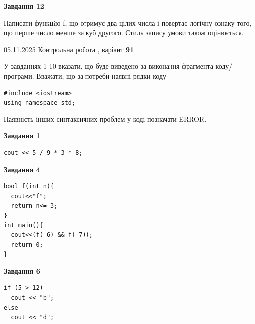 \documentclass[12pt, ukrainian]{article}
\begin{document}
{\begin {large}
\begin{minipage}[t]{11.0cm}
\begin{center}
\textbf{Завдання 12}
\end{center}

Написати функцiю f, що отримує два цілих числа і повертає логічну ознаку того, що перше число менше за куб другого. Стиль запису умови також оцінюється.\par

\end{minipage}

\end {large}}
\newpage

{\Large{05.11.2025 Контрольна робота , варіант  \No \textbf { 91 }\par}}
{
\begin {large}
У завданнях 1-10 вказати, що буде виведено за виконання фрагмента коду/про\-гра\-ми.
Вважати, що за потреби наявні рядки коду
\begin{verbatim}
#include <iostream>
using namespace std;
\end{verbatim}
Наявність інших синтаксичних проблем у коді позначати ERROR.

\begin{minipage}[t]{7.0cm}

\begin{center}
\textbf{Завдання 1}
\end{center}
\vspace{-8mm}

\begin{verbatim}
cout << 5 / 9 * 3 * 8;
\end{verbatim}



\begin{center}
\textbf{Завдання 4}
\end{center}
\vspace{-8mm}

\begin{verbatim}
bool f(int n){
  cout<<"f";
  return n<=-3;
}
int main(){
  cout<<(f(-6) && f(-7));
  return 0;
}
\end{verbatim}



\begin{center}
\textbf{Завдання 6}
\end{center}
\vspace{-8mm}

\begin{verbatim}
if (5 > 12)
  cout << "b";
else
  cout << "d";
\end{verbatim}




\end{minipage}
\end{large}}
\end{document}
